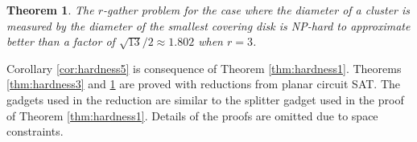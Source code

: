 \documentclass{acm_proc_article-sp}
\newtheorem{theorem}{Theorem}
\begin{document}
\begin{theorem}\label{thm:hardness4}
The $r$-gather problem for the case where the diameter of a cluster is measured by the diameter of the smallest covering disk is NP-hard to approximate better than a factor of $\sqrt{13}/2 \approx 1.802$ when $r=3$.
\end{theorem}

Corollary \ref{cor:hardness5} is consequence of Theorem \ref{thm:hardness1}.  Theorems \ref{thm:hardness3} and \ref{thm:hardness4} are proved with reductions from planar circuit SAT.  The gadgets used in the reduction are similar to the splitter gadget used in the proof of Theorem \ref{thm:hardness1}.  Details of the proofs are omitted due to space constraints.

\end{document}
